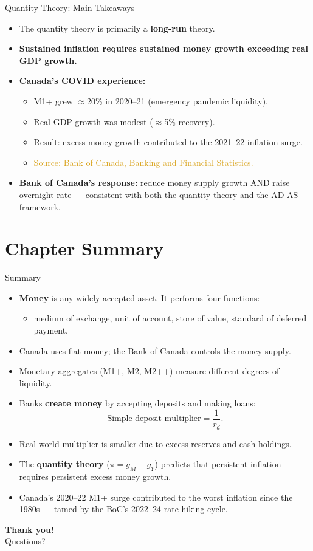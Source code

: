 \documentclass[aspectratio=169]{beamer}
\begin{document}
\begin{frame}{Quantity Theory: Main Takeaways}
\transfade
\begin{itemize}[<+->]
  \item The quantity theory is primarily a \textbf{long-run} theory.
  \item \textbf{Sustained inflation requires sustained money growth exceeding real GDP growth.}
  \item \textbf{Canada's COVID experience:}
  \begin{itemize}[<+->]
    \item M1+ grew $\approx$20\% in 2020--21 (emergency pandemic liquidity).
    \item Real GDP growth was modest ($\approx$5\% recovery).
    \item Result: excess money growth contributed to the 2021--22 inflation surge.
    \item \textcolor{goldenrod}{Source: Bank of Canada, Banking and Financial Statistics.}
  \end{itemize}
  \item \textbf{Bank of Canada's response:} reduce money supply growth AND raise overnight rate --- consistent with both the quantity theory and the AD-AS framework.
\end{itemize}
\end{frame}

\section*{Chapter Summary}

\begin{frame}{Summary}
\transfade
\begin{itemize}[<+->]
  \item \textbf{Money} is any widely accepted asset. It performs four functions:
  \begin{itemize}[<+->]
    \item medium of exchange, unit of account, store of value, standard of deferred payment.
  \end{itemize}
  \item Canada uses fiat money; the Bank of Canada controls the money supply.
  \item Monetary aggregates (M1+, M2, M2++) measure different degrees of liquidity.
  \item Banks \textbf{create money} by accepting deposits and making loans:
  \[
    \text{Simple deposit multiplier} = \frac{1}{r_d}.
  \]
  \item Real-world multiplier is smaller due to excess reserves and cash holdings.
  \item The \textbf{quantity theory} ($\pi = g_M - g_Y$) predicts that persistent inflation requires persistent excess money growth.
  \item Canada's 2020--22 M1+ surge contributed to the worst inflation since the 1980s --- tamed by the BoC's 2022--24 rate hiking cycle.
\end{itemize}
\end{frame}

\begin{frame}
\centering
\Huge \textbf{Thank you!}\\[1em]
\large Questions?
\end{frame}
\end{document}
